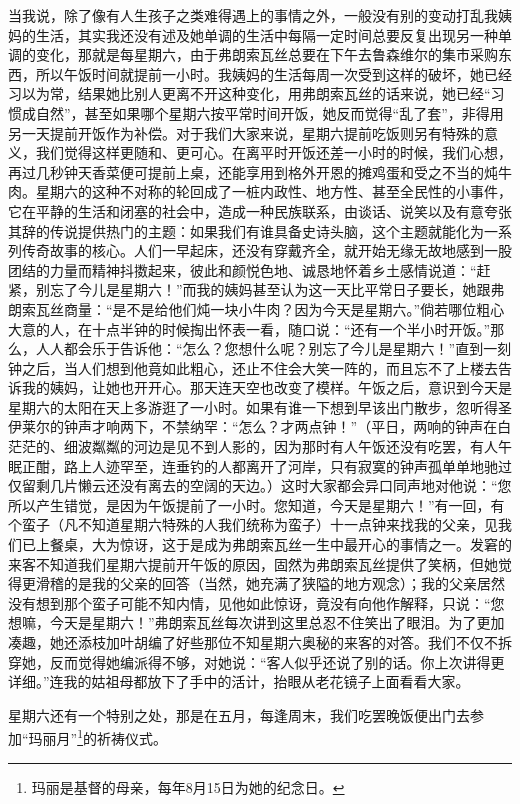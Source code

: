 \par 当我说，除了像有人生孩子之类难得遇上的事情之外，一般没有别的变动打乱我姨妈的生活，其实我还没有述及她单调的生活中每隔一定时间总要反复出现另一种单调的变化，那就是每星期六，由于弗朗索瓦丝总要在下午去鲁森维尔的集市采购东西，所以午饭时间就提前一小时。我姨妈的生活每周一次受到这样的破坏，她已经习以为常，结果她比别人更离不开这种变化，用弗朗索瓦丝的话来说，她已经“习惯成自然”，甚至如果哪个星期六按平常时间开饭，她反而觉得“乱了套”，非得用另一天提前开饭作为补偿。对于我们大家来说，星期六提前吃饭则另有特殊的意义，我们觉得这样更随和、更可心。在离平时开饭还差一小时的时候，我们心想，再过几秒钟天香菜便可提前上桌，还能享用到格外开恩的摊鸡蛋和受之不当的炖牛肉。星期六的这种不对称的轮回成了一桩内政性、地方性、甚至全民性的小事件，它在平静的生活和闭塞的社会中，造成一种民族联系，由谈话、说笑以及有意夸张其辞的传说提供热门的主题：如果我们有谁具备史诗头脑，这个主题就能化为一系列传奇故事的核心。人们一早起床，还没有穿戴齐全，就开始无缘无故地感到一股团结的力量而精神抖擞起来，彼此和颜悦色地、诚恳地怀着乡土感情说道：“赶紧，别忘了今儿是星期六！”而我的姨妈甚至认为这一天比平常日子要长，她跟弗朗索瓦丝商量：“是不是给他们炖一块小牛肉？因为今天是星期六。”倘若哪位粗心大意的人，在十点半钟的时候掏出怀表一看，随口说：“还有一个半小时开饭。”那么，人人都会乐于告诉他：“怎么？您想什么呢？别忘了今儿是星期六！”直到一刻钟之后，当人们想到他竟如此粗心，还止不住会大笑一阵的，而且忘不了上楼去告诉我的姨妈，让她也开开心。那天连天空也改变了模样。午饭之后，意识到今天是星期六的太阳在天上多游逛了一小时。如果有谁一下想到早该出门散步，忽听得圣伊莱尔的钟声才响两下，不禁纳罕：“怎么？才两点钟！”（平日，两响的钟声在白茫茫的、细波粼粼的河边是见不到人影的，因为那时有人午饭还没有吃罢，有人午眠正酣，路上人迹罕至，连垂钓的人都离开了河岸，只有寂寞的钟声孤单单地驰过仅留剩几片懒云还没有离去的空阔的天边。）这时大家都会异口同声地对他说：“您所以产生错觉，是因为午饭提前了一小时。您知道，今天是星期六！”有一回，有个蛮子（凡不知道星期六特殊的人我们统称为蛮子）十一点钟来找我的父亲，见我们已上餐桌，大为惊讶，这于是成为弗朗索瓦丝一生中最开心的事情之一。发窘的来客不知道我们星期六提前开午饭的原因，固然为弗朗索瓦丝提供了笑柄，但她觉得更滑稽的是我的父亲的回答（当然，她充满了狭隘的地方观念）；我的父亲居然没有想到那个蛮子可能不知内情，见他如此惊讶，竟没有向他作解释，只说：“您想嘛，今天是星期六！”弗朗索瓦丝每次讲到这里总忍不住笑出了眼泪。为了更加凑趣，她还添枝加叶胡编了好些那位不知星期六奥秘的来客的对答。我们不仅不拆穿她，反而觉得她编派得不够，对她说：“客人似乎还说了别的话。你上次讲得更详细。”连我的姑祖母都放下了手中的活计，抬眼从老花镜子上面看看大家。
\par 星期六还有一个特别之处，那是在五月，每逢周末，我们吃罢晚饭便出门去参加“玛丽月”\footnote{玛丽是基督的母亲，每年8月15日为她的纪念日。}的祈祷仪式。

